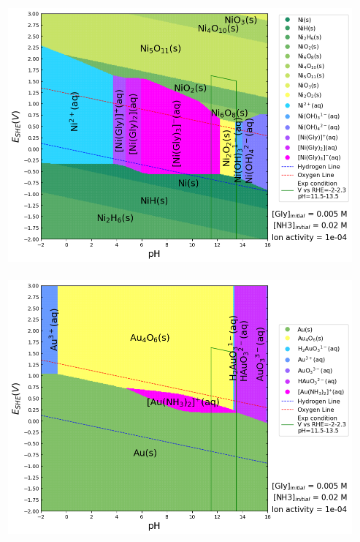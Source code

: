 \documentclass[journal=jacsat,manuscript=article]{achemso}
\begin{document}
\begin{figure}[htbp]
    \centering
    \begin{subfigure}[b]{0.3\textwidth}
        \subcaption{}\label{fig:Ni_Pourbaix}
        \includegraphics[width=\textwidth]{Figures/pourbaix_diagrams/Ni-NH3-H2O_activity=1e-04_[NH3]=0.02M_[Gly]=0.005M_[CN]=0.png}
        \par\medskip
    \end{subfigure}
    \begin{subfigure}[b]{0.3\textwidth}
        \subcaption{}\label{fig:Au_Pourbaix}
        \includegraphics[width=\textwidth]{Figures/pourbaix_diagrams/Au-NH3-H2O_activity=1e-04_[NH3]=0.02M_[Gly]=0.005M_[CN]=0.png}
        \par\medskip

\end{subfigure}
\end{figure}
\end{document}
